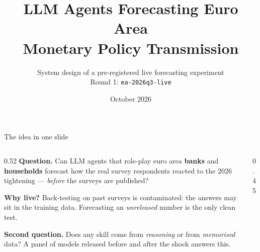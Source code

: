 \documentclass[aspectratio=169,10pt]{beamer}
\title{LLM Agents Forecasting Euro Area\\Monetary Policy Transmission}
\subtitle{System design of a pre-registered live forecasting experiment\\Round 1: \texttt{ea-2026q3-live}}
\date{October 2026}
\begin{document}
\begin{frame}
  \titlepage
\end{frame}

\begin{frame}{The idea in one slide}
  \begin{columns}[T]
    \begin{column}{0.52\textwidth}
      \textbf{Question.} Can LLM agents that role-play euro area \textcolor{bank}{\textbf{banks}} and
      \textcolor{hh}{\textbf{households}} forecast how the real survey respondents reacted to the 2026
      tightening --- \emph{before} the surveys are published?

      \vspace{2mm}
      \textbf{Why live?} Back-testing on past surveys is contaminated: the answers may sit in the
      training data. Forecasting an \emph{unreleased} number is the only clean test.

      \vspace{2mm}
      \textbf{Second question.} Does any skill come from \emph{reasoning} or from \emph{memorised} data?
      A panel of models released before and after the shock answers this.
    \end{column}
    \begin{column}{0.45\textwidth}
    \end{column}
  \end{columns}
\end{frame}
\end{document}

